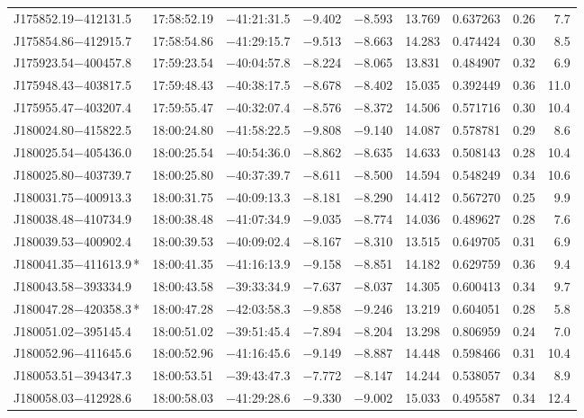 \begin{table*}[ht!]
\begin{tabular}{lcccccccr}
J175852.19$-$412131.5 & 17:58:52.19 & $-$41:21:31.5 & $-$9.402 & $-$8.593 & 13.769 & 0.637263 & 0.26 & 7.7 \\
J175854.86$-$412915.7 & 17:58:54.86 & $-$41:29:15.7 & $-$9.513 & $-$8.663 & 14.283 & 0.474424 & 0.30 & 8.5 \\
J175923.54$-$400457.8 & 17:59:23.54 & $-$40:04:57.8 & $-$8.224 & $-$8.065 & 13.831 & 0.484907 & 0.32 & 6.9 \\
J175948.43$-$403817.5 & 17:59:48.43 & $-$40:38:17.5 & $-$8.678 & $-$8.402 & 15.035 & 0.392449 & 0.36 & 11.0 \\
J175955.47$-$403207.4 & 17:59:55.47 & $-$40:32:07.4 & $-$8.576 & $-$8.372 & 14.506 & 0.571716 & 0.30 & 10.4 \\
J180024.80$-$415822.5 & 18:00:24.80 & $-$41:58:22.5 & $-$9.808 & $-$9.140 & 14.087 & 0.578781 & 0.29 & 8.6 \\
J180025.54$-$405436.0 & 18:00:25.54 & $-$40:54:36.0 & $-$8.862 & $-$8.635 & 14.633 & 0.508143 & 0.28 & 10.4 \\
J180025.80$-$403739.7 & 18:00:25.80 & $-$40:37:39.7 & $-$8.611 & $-$8.500 & 14.594 & 0.548249 & 0.34 & 10.6 \\
J180031.75$-$400913.3 & 18:00:31.75 & $-$40:09:13.3 & $-$8.181 & $-$8.290 & 14.412 & 0.567270 & 0.25 & 9.9 \\
J180038.48$-$410734.9 & 18:00:38.48 & $-$41:07:34.9 & $-$9.035 & $-$8.774 & 14.036 & 0.489627 & 0.28 & 7.6 \\
J180039.53$-$400902.4 & 18:00:39.53 & $-$40:09:02.4 & $-$8.167 & $-$8.310 & 13.515 & 0.649705 & 0.31 & 6.9 \\
J180041.35$-$411613.9\,* & 18:00:41.35 & $-$41:16:13.9 & $-$9.158 & $-$8.851 & 14.182 & 0.629759 & 0.36 & 9.4 \\
J180043.58$-$393334.9 & 18:00:43.58 & $-$39:33:34.9 & $-$7.637 & $-$8.037 & 14.305 & 0.600413 & 0.34 & 9.7 \\
J180047.28$-$420358.3\,* & 18:00:47.28 & $-$42:03:58.3 & $-$9.858 & $-$9.246 & 13.219 & 0.604051 & 0.28 & 5.8 \\
J180051.02$-$395145.4 & 18:00:51.02 & $-$39:51:45.4 & $-$7.894 & $-$8.204 & 13.298 & 0.806959 & 0.24 & 7.0 \\
J180052.96$-$411645.6 & 18:00:52.96 & $-$41:16:45.6 & $-$9.149 & $-$8.887 & 14.448 & 0.598466 & 0.31 & 10.4 \\
J180053.51$-$394347.3 & 18:00:53.51 & $-$39:43:47.3 & $-$7.772 & $-$8.147 & 14.244 & 0.538057 & 0.34 & 8.9 \\
J180058.03$-$412928.6 & 18:00:58.03 & $-$41:29:28.6 & $-$9.330 & $-$9.002 & 15.033 & 0.495587 & 0.34 & 12.4 \\

\end{tabular}
\end{table*}
